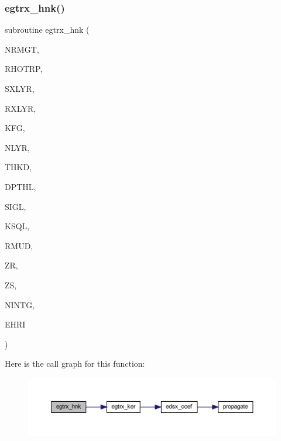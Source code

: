 \subsubsection{\texorpdfstring{egtrx\+\_\+hnk()}{egtrx\_hnk()}}
{\footnotesize\ttfamily subroutine egtrx\+\_\+hnk (\begin{DoxyParamCaption}\item[{integer}]{N\+R\+M\+GT,  }\item[{real, dimension(nrmgt)}]{R\+H\+O\+T\+RP,  }\item[{integer}]{S\+X\+L\+YR,  }\item[{integer}]{R\+X\+L\+YR,  }\item[{integer}]{K\+FG,  }\item[{integer}]{N\+L\+YR,  }\item[{real (kind=ql), dimension(nlyr)}]{T\+H\+KD,  }\item[{real (kind=ql), dimension(nlyr)}]{D\+P\+T\+HL,  }\item[{complex(kind=ql), dimension(nlyr)}]{S\+I\+GL,  }\item[{complex(kind=ql), dimension(nlyr)}]{K\+S\+QL,  }\item[{real (kind=ql), dimension(0\+:nlyr)}]{R\+M\+UD,  }\item[{real (kind=ql)}]{ZR,  }\item[{real (kind=ql)}]{ZS,  }\item[{integer}]{N\+I\+N\+TG,  }\item[{complex (kind=ql), dimension(nrmgt,6)}]{E\+H\+RI }\end{DoxyParamCaption})}

Here is the call graph for this function\+:\nopagebreak
\begin{figure}[H]
\begin{center}
\leavevmode
\includegraphics[width=350pt]{Leroi__c_8f90_a5489646b1d19d3a2a814c56265bd78fb_cgraph}
\end{center}
\end{figure}
\mbox{\label{Leroi__c_8f90_aed79c3eb3332f2cd1b4c25c6c825e360}} 
